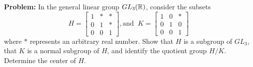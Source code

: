 \documentclass[10pt]{article}
\newenvironment{problem}{\textbf{Problem:}}{}
\begin{document}
\begin{problem}
	In the general linear group \( GL_3(\mathbb R) \), consider the subsets
	\[
		H = \begin{bmatrix} 1 & * & * \\0 & 1 & * \\ 0 & 0 & 1  \end{bmatrix} , 
		\text{and } \ 
		K = \begin{bmatrix} 1 & 0 & * \\ 0 & 1 & 0\\ 0 & 0 & 1 \end{bmatrix} 
	\] 
	where \( * \) represents an arbitrary real number. Show that \( H \) is a 
	subgroup of \( GL_3 \), that \( K \) is a normal subgroup of \( H \), and 
	identify the quotient group \( H / K \). Determine the center of \( H \). 
\end{problem}
\end{document}
